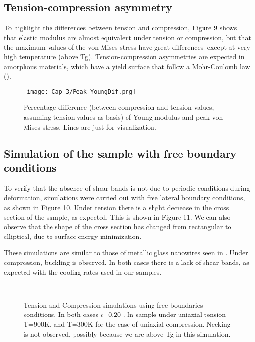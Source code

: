 \subsection{Tension-compression asymmetry}

To highlight the differences between tension and compression, Figure 9 shows that elastic modulus are almost equivalent under tension or compression, but that the maximum values of the von Mises stress have great differences, except at very high temperature (above Tg). Tension-compression asymmetries are expected in amorphous materials, which have a yield surface that follow a Mohr-Coulomb law (\cite{schuh03}).

\begin{figure}[htp]
\centering
\texttt{[image: Cap\_3/Peak\_YoungDif.png]}
\caption{Percentage difference (between compression and tension values, assuming tension values as basis) of Young modulus and peak von Mises stress. Lines are just for visualization.}
\label{C3:fg:peakYoungDif}
\end{figure}

\subsection{Simulation of the sample with free boundary conditions}

To verify that the absence of shear bands is not due to periodic conditions during deformation, simulations were carried out with free lateral boundary conditions, as shown in Figure 10. Under tension there is a slight decrease in the cross section of the sample, as expected. This is shown in Figure 11. We can also observe that the shape of the cross section has changed from rectangular to elliptical, due to surface energy minimization.

These simulations are similar to those of metallic glass nanowires seen in \cite{xiao12}. Under compression, buckling is observed. In both cases there is a lack of shear bands, as expected with the cooling rates used in our samples.

\begin{figure}[htp]
\centering
{}
\\
\caption{Tension and Compression simulations using free boundaries conditions. In both cases $\epsilon$=0.20 . In sample under uniaxial tension T=900K, and T=300K for the case of uniaxial compression. Necking is not observed, possibly because we are above Tg in this simulation.}
\label{C3:fg:libres}
\end{figure}

